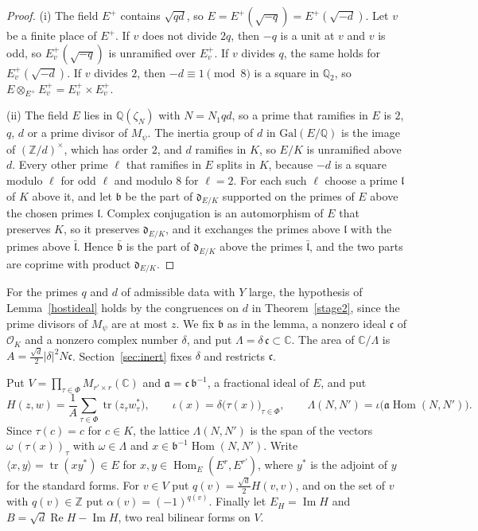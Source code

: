 \begin{proof}
(i) The field $E^+$ contains $\sqrt{qd}$, so $E=E^+(\sqrt{-q})=E^+(\sqrt{-d})$. Let $v$ be a finite place of $E^+$. If $v$ does not divide $2q$, then $-q$ is a unit at $v$ and $v$ is odd, so $E^+_v(\sqrt{-q})$ is unramified over $E^+_v$. If $v$ divides $q$, the same holds for $E^+_v(\sqrt{-d})$. If $v$ divides $2$, then $-d\equiv1\pmod8$ is a square in $\mathbb Q_2$, so $E\otimes_{E^+}E^+_v=E^+_v\times E^+_v$.

(ii) The field $E$ lies in $\mathbb Q(\zeta_N)$ with $N=N_1qd$, so a prime that ramifies in $E$ is $2$, $q$, $d$ or a prime divisor of $M_\psi$. The inertia group of $d$ in $\mathrm{Gal}(E/\mathbb Q)$ is the image of $(\mathbb Z/d)^\times$, which has order $2$, and $d$ ramifies in $K$, so $E/K$ is unramified above $d$. Every other prime $\ell$ that ramifies in $E$ splits in $K$, because $-d$ is a square modulo $\ell$ for odd $\ell$ and modulo $8$ for $\ell=2$. For each such $\ell$ choose a prime $\mathfrak l$ of $K$ above it, and let $\mathfrak b$ be the part of $\mathfrak d_{E/K}$ supported on the primes of $E$ above the chosen primes $\mathfrak l$. Complex conjugation is an automorphism of $E$ that preserves $K$, so it preserves $\mathfrak d_{E/K}$, and it exchanges the primes above $\mathfrak l$ with the primes above $\bar{\mathfrak l}$. Hence $\bar{\mathfrak b}$ is the part of $\mathfrak d_{E/K}$ above the primes $\bar{\mathfrak l}$, and the two parts are coprime with product $\mathfrak d_{E/K}$.
\end{proof}

For the primes $q$ and $d$ of admissible data with $Y$ large, the hypothesis of Lemma~\ref{hostideal} holds by the congruences on $d$ in Theorem~\ref{stage2}, since the prime divisors of $M_\psi$ are at most $z$. We fix $\mathfrak b$ as in the lemma, a nonzero ideal $\mathfrak c$ of $\mathcal O_K$ and a nonzero complex number $\delta$, and put $\Lambda=\delta\,\mathfrak c\subset\mathbb C$. The area of $\mathbb C/\Lambda$ is $A=\frac{\sqrt d}2\lvert\delta\rvert^2N\mathfrak c$. Section~\ref{sec:inert} fixes $\delta$ and restricts $\mathfrak c$.

Put $V=\prod_{\tau\in\Phi}M_{r'\times r}(\mathbb C)$ and $\mathfrak a=\mathfrak c\,\mathfrak b^{-1}$, a fractional ideal of $E$, and put
\[
H(z,w)=\frac1A\sum_{\tau\in\Phi}\operatorname{tr}\big(z_\tau w_\tau^\ast\big),\qquad\iota(x)=\delta\big(\tau(x)\big)_{\tau\in\Phi},\qquad\Lambda(N,N')=\iota\big(\mathfrak a\operatorname{Hom}(N,N')\big).
\]
Since $\tau(c)=c$ for $c\in K$, the lattice $\Lambda(N,N')$ is the span of the vectors $\omega\,(\tau(x))_\tau$ with $\omega\in\Lambda$ and $x\in\mathfrak b^{-1}\operatorname{Hom}(N,N')$. Write $\langle x,y\rangle=\operatorname{tr}(xy^\ast)\in E$ for $x,y\in\operatorname{Hom}_E(E^r,E^{r'})$, where $y^\ast$ is the adjoint of $y$ for the standard forms. For $v\in V$ put $q(v)=\frac{\sqrt d}2H(v,v)$, and on the set of $v$ with $q(v)\in\mathbb Z$ put $\alpha(v)=(-1)^{q(v)}$. Finally let $E_H=\operatorname{Im}H$ and $B=\sqrt d\operatorname{Re}H-\operatorname{Im}H$, two real bilinear forms on $V$.

